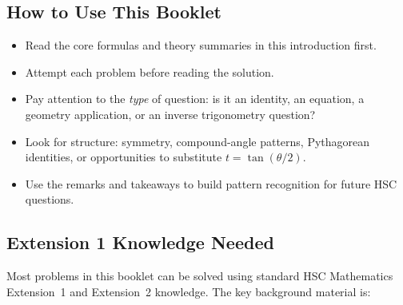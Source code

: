 \documentclass[12pt]{article}
\begin{document}
\subsection{How to Use This Booklet}
\begin{itemize}[leftmargin=*]
  \item Read the core formulas and theory summaries in this introduction first.
  \item Attempt each problem before reading the solution.
  \item Pay attention to the \emph{type} of question: is it an identity, an equation, a geometry application, or an inverse trigonometry question?
  \item Look for structure: symmetry, compound-angle patterns, Pythagorean identities, or opportunities to substitute $t = \tan(\theta/2)$.
  \item Use the remarks and takeaways to build pattern recognition for future HSC questions.
\end{itemize}

\subsection{Extension 1 Knowledge Needed}
Most problems in this booklet can be solved using standard HSC Mathematics Extension~1 and Extension~2 knowledge. The key background material is:
\end{document}
